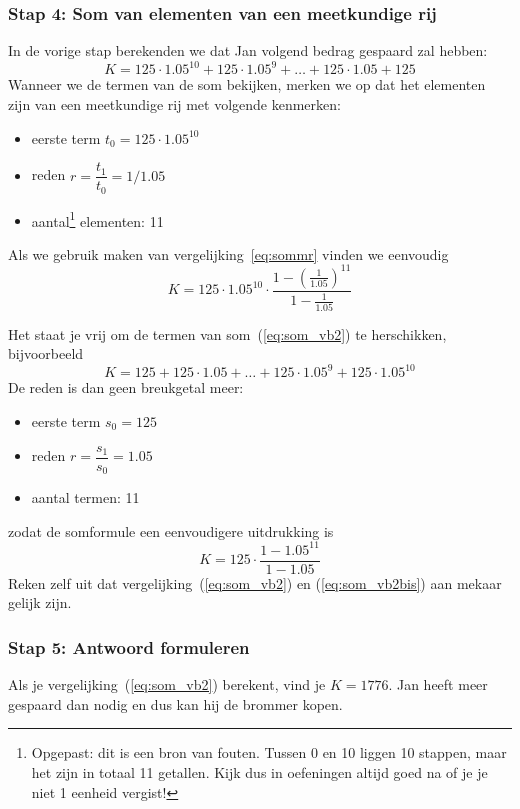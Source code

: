 \subsubsection{Stap 4: Som van elementen van een meetkundige rij}
In de vorige stap berekenden we dat Jan volgend bedrag gespaard zal hebben:
\begin{equation}
K= 125\cdot \num{1.05}^{10}+125\cdot \num{1.05}^9+\dots+125\cdot \num{1.05}+125
\label{eq:som_vb2}
\end{equation}
Wanneer we de termen van de som bekijken, merken we op dat het elementen zijn van een meetkundige rij met volgende kenmerken:
\begin{itemize}
\item eerste term $t_0=125\cdot \num{1.05}^{10}$
\item reden $r=\dfrac{t_1}{t_0}=1/\num{1.05}$
\item aantal\footnote{Opgepast: dit is een bron van
    fouten. Tussen 0 en 10 liggen 10 stappen, maar het zijn in totaal 11
    getallen. Kijk dus in oefeningen altijd goed na of je je niet 1
    eenheid vergist!} elementen: 11
\end{itemize}
Als we gebruik maken van vergelijking~\eqref{eq:sommr} vinden we eenvoudig
\begin{equation}
K=125\cdot\num{1.05}^{10}\cdot \dfrac{1-\left(\frac{1}{\num{1.05}}\right)^{11}}    {1-\frac{1}{\num{1.05}} }
\end{equation}

Het staat je vrij om de termen van som~(\ref{eq:som_vb2}) te herschikken, bijvoorbeeld
\begin{equation}
K=125 +125\cdot \num{1.05}+\dots+125\cdot \num{1.05}^9+125\cdot \num{1.05}^{10}
\label{eq:som_vb2_anders}
\end{equation}
De reden is dan geen breukgetal meer:
\begin{itemize}
\item eerste term $s_0=125$
\item reden $r=\dfrac{s_1}{s_0}=\num{1.05}$
\item aantal termen: 11
\end{itemize}
zodat de somformule een eenvoudigere uitdrukking is 
\begin{equation}
K=125\cdot \frac{1-\num{1.05}^{11}} {1-\num{1.05}}
\label{eq:som_vb2bis}
\end{equation}
Reken zelf uit dat vergelijking~(\ref{eq:som_vb2}) en (\ref{eq:som_vb2bis}) aan mekaar gelijk zijn. 

\subsubsection{Stap 5: Antwoord formuleren}
Als je vergelijking~(\ref{eq:som_vb2}) berekent, vind je $K=1776$. Jan heeft  meer gespaard dan nodig en dus kan hij de brommer kopen.

